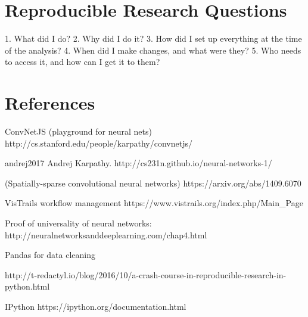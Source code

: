 \documentclass[12pt,letterpaper,boxed]{article}
\begin{document}
\section{Reproducible Research Questions}

1. What did I do?
2. Why did I do it?
3. How did I set up everything at the time of the analysis?
4. When did I make changes, and what were they?
5. Who needs to access it, and how can I get it to them?

\section{References}
ConvNetJS (playground for neural nets)
http://cs.stanford.edu/people/karpathy/convnetjs/

andrej2017
Andrej Karpathy. http://cs231n.github.io/neural-networks-1/

(Spatially-sparse convolutional neural networks) https://arxiv.org/abs/1409.6070

VisTrails workflow management
https://www.vistrails.org/index.php/Main_Page

Proof of universality of neural networks:
http://neuralnetworksanddeeplearning.com/chap4.html


Pandas for data cleaning

http://t-redactyl.io/blog/2016/10/a-crash-course-in-reproducible-research-in-python.html

IPython
https://ipython.org/documentation.html
\end{document}
